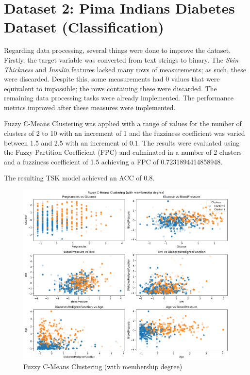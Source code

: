 \section{Dataset 2: Pima Indians Diabetes Dataset (Classification)}

Regarding data processing, several things were done to improve the dataset. Firstly, the target variable was converted from text strings to binary. The \textit{Skin Thickness} and \textit{Insulin} features lacked many rows of measurements; as such, these were discarded. Despite this, some measurements had 0 values that were equivalent to impossible; the rows containing these were discarded. The remaining data processing tasks were already implemented. The performance metrics improved after these measures were implemented.

Fuzzy C-Means Clustering was applied with a range of values for the number of clusters of 2 to 10 with an increment of 1 and the fuzziness coefficient was varied between 1.5 and 2.5 with an increment of 0.1. The results were evaluated using the Fuzzy Partition Coefficient (FPC) and culminated in a number of 2 clusters and a fuzziness coefficient of 1.5 achieving a FPC of 0.7231894414858948.

The resulting TSK model achieved an ACC of 0.8.

\begin{figure}[h!]
    \centering
    \includegraphics[width=1\textwidth]{Plots/Fuzzy C-Means Clustering (with membership degree) CLF.pdf}
    \caption{Fuzzy C-Means Clustering (with membership degree)}
    \label{fig:my_label}
\end{figure}

